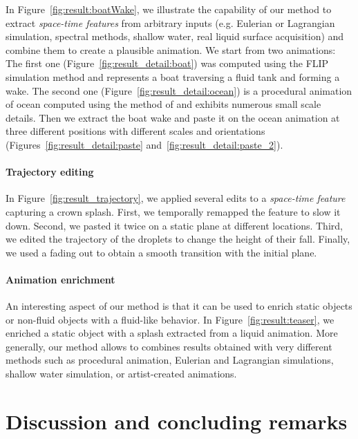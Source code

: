 In Figure~\ref{fig:result:boatWake}, we illustrate the capability of our method to extract \emph{space-time features} from arbitrary inputs (e.g. Eulerian or Lagrangian simulation, spectral methods, shallow water, real liquid surface acquisition) and combine them to create a plausible animation.
We start from two animations: 
The first one (Figure~\ref{fig:result_detail:boat}) 
was computed using the FLIP simulation method \cite{Zhu2005} and represents a boat traversing a fluid tank and forming a wake.
The second one (Figure~\ref{fig:result_detail:ocean}) is a procedural animation of ocean computed using the method of \cite{Tessendorf2004} and exhibits numerous small scale details.
Then we extract the boat wake and paste it on the ocean animation at three different positions with different scales and orientations (Figures~\ref{fig:result_detail:paste} and~\ref{fig:result_detail:paste_2}).

\paragraph{Trajectory editing}

In Figure~\ref{fig:result_trajectory}, we applied several edits to a \emph{space-time feature} capturing a crown splash. First, we temporally remapped the feature to slow it down. 
Second, we pasted it twice on a static plane at different locations. 
Third, we edited the trajectory of the droplets to change the height of their fall. 
Finally, we used a fading out to obtain a smooth transition with the initial plane.

\paragraph{Animation enrichment}

An interesting aspect of our method is that it can be used to enrich static objects or non-fluid objects with a fluid-like behavior. 
In Figure~\ref{fig:result:teaser}, we enriched a static object with a splash extracted from a liquid animation.
More generally, our method allows to combines results obtained with very different methods such as procedural animation, Eulerian and Lagrangian simulations, shallow water simulation, or artist-created animations.

\section{Discussion and concluding remarks} \label{sec:fluidsculpting:discussion}

